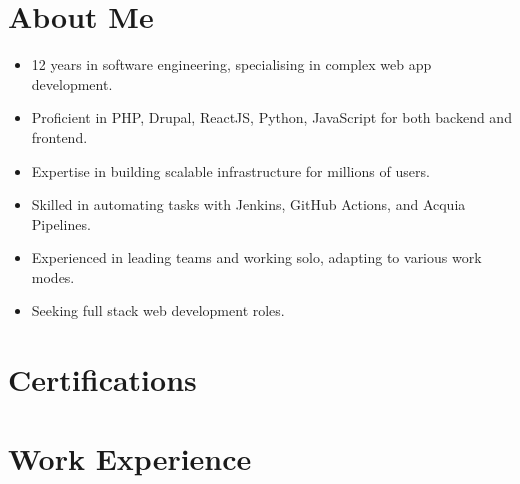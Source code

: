 \documentclass[12pt,a4paper,sans]{moderncv}
\begin{document}
\vspace*{-2\baselineskip}
\maketitle
\vspace{-1.5\baselineskip}


\section{About Me}
\begin{itemize}
\item 12 years in software engineering, specialising in complex web app development.
\item Proficient in PHP, Drupal, ReactJS, Python, JavaScript for both backend and frontend.
\item Expertise in building scalable infrastructure for millions of users.
\item Skilled in automating tasks with Jenkins, GitHub Actions, and Acquia Pipelines.
\item Experienced in leading teams and working solo, adapting to various work modes.
\item Seeking full stack web development roles.
\end{itemize}

\section{Certifications}

\section{Work Experience}
\end{document}
